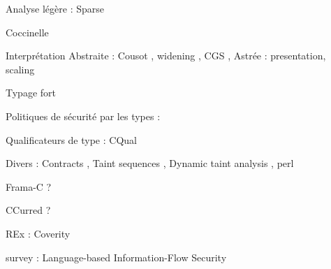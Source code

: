 Analyse légère : Sparse 

Coccinelle \cite{coccinelle09} \cite{coccinelle11} 

Interprétation Abstraite : Cousot \cite{Cousot77,Cousot92-1},
    widening \cite{granger},
    CGS \cite{cgs},
    Astrée : presentation\cite{Astree04,Astree05}, scaling \cite{AstreeScale}

Typage fort \cite{TAPL}

Politiques de sécurité par les types : \cite{lightweight-static-capabilities,LZ06a}

Qualificateurs de type : CQual \cite{pldi99,usenix01,pldi02,cquk-usenix04,toplas-quals}

Divers : Contracts \cite{cssv}, Taint sequences \cite{mdv10}, Dynamic taint analysis \cite{oakland10}, perl

Frama-C ?

CCurred ?

REx : Coverity \cite{coverityBillion}

survey : Language-based Information-Flow Security \cite{sm-jsac03}
